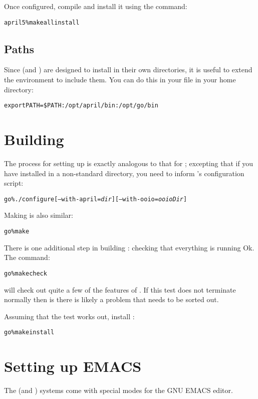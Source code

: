 Once configured, compile \april and install it using the  command:
\begin{alltt}
april5 \% make all install
\end{alltt}

\subsection{Paths}
Since \april (and \go) are designed to install in their own directories, it is useful to extend the  environment to include them. You can do this in your  file in your home directory:
\begin{alltt}
export PATH=\$PATH:/opt/april/bin:/opt/go/bin
\end{alltt}

\section{Building \go}
The process for setting up \go is exactly analogous to that for \april; excepting that if you have installed \april in a non-standard directory, you need to inform \go's configuration script:
\begin{alltt}
go \% ./configure[--with-april=\emph{dir}] [--with-ooio=\emph{ooioDir}]
\end{alltt}

Making \go is also similar:
\begin{alltt}
go \% make
\end{alltt}
There is one additional step in building \go: checking that everything is running Ok. The command:
\begin{alltt}
go \% make check
\end{alltt}
will check out quite a few of the features of \go. If this test does not terminate normally then is there is likely a problem that needs to be sorted out.

Assuming that the test works out, install \go:
\begin{alltt}
go \% make install
\end{alltt}

\section{Setting up EMACS}
\label{install:emacs}
The \go (and \april) systems come with special modes for the GNU EMACS editor.

